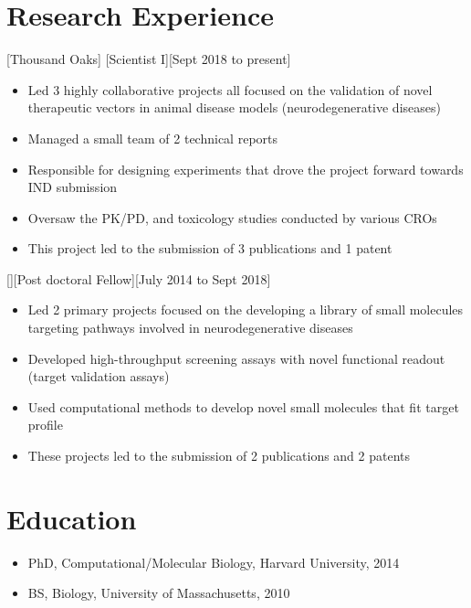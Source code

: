\documentclass{article}
\begin{document}
\section{Research Experience}

[Thousand Oaks]
[Scientist I][Sept 2018 to present]

\begin{itemize}
\item Led 3 highly collaborative projects all focused on the validation of novel therapeutic vectors in animal disease models (neurodegenerative diseases)
\item Managed a small team of 2 technical reports
\item Responsible for designing experiments that drove the project forward towards IND submission
\item Oversaw the PK/PD, and toxicology studies conducted by various CROs
\item This project led to the submission of 3 publications and 1 patent
\end{itemize}

[][Post doctoral Fellow][July 2014 to Sept 2018]

\begin{itemize}
\item Led 2 primary projects focused on the developing a library of small molecules targeting pathways involved in neurodegenerative diseases
\item Developed high-throughput screening assays with novel functional readout (target validation assays)
\item Used computational methods to develop novel small molecules that fit target profile
\item These projects led to the submission of 2 publications and 2 patents
\end{itemize}


\section{Education}

\begin{itemize}
\item PhD, Computational/Molecular Biology, Harvard University, 2014
\item BS, Biology, University of Massachusetts, 2010
\end{itemize}
\end{document}
